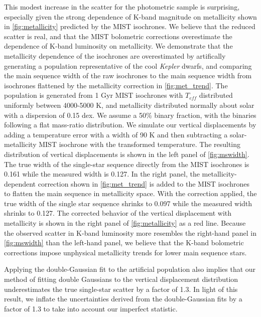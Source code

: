 \documentclass[manuscript]{aastex6}
\newcommand{\Kepler}{\mbox{\textit{Kepler}}}
\newcommand{\Teff}{\ensuremath{T_{eff}}}
\begin{document}
This modest increase in the scatter for the photometric sample is surprising,
especially given the strong dependence of K-band magnitude on metallicity shown
in \cref{fig:metallicity} predicted by the MIST isochrones. We believe that the
reduced scatter is real, and that the MIST bolometric corrections overestimate 
the dependence of K-band luminosity on metallicity. We demonstrate that the
metallicity dependence of the isochrones are overestimated by artifically
generating a population representative of the cool \Kepler{} dwarfs, and
comparing the main sequence width of the raw isochrones to the main sequence
width from isochrones flattened by the metallicity correction
in \cref{fig:met_trend}. The population is generated from 1 Gyr MIST 
isochrones with \Teff{} distributed uniformly between 4000-5000 K, and
metallicity distributed normally about solar with a dispersion of 0.15 dex. We
assume a 50\% binary fraction, with the binaries following a flat mass-ratio
distribution. We simulate our vertical displacements by adding a temperature 
error with a width of 90 K and then subtracting a solar-metallicity MIST
isochrone with the transformed temperature. The resulting distribution of
vertical displacements is shown in the left panel of \cref{fig:mswidth}. The
true width of the single-star sequence directly from the MIST isochrones is 
0.161 while the measured width is 0.127. In the right panel, the 
metallicity-dependent correction shown in \cref{fig:met_trend} is added to 
the MIST isochrones to flatten the main sequence in metallicity space. With 
the correction applied, the true width of the single star sequence shrinks to 
0.097 while the measured width shrinks to 0.127. The corrected behavior of 
the vertical displacement with metallicity is shown in the right panel of 
\cref{fig:metallicity} as a red line. Because the observed scatter in K-band
luminosity more resembles the right-hand panel in \cref{fig:mswidth} than the
left-hand panel, we believe that the K-band bolometric corrections impose 
unphysical metallicity trends for lower main sequence stars.

Applying the double-Gaussian fit to the artificial population also implies 
that our method of fitting double Gaussians to the vertical displacement 
distribution underestimates the true single-star scatter by a factor of 1.3. 
In light of this result, we inflate the uncertainties derived from the
double-Gaussian fits by a factor of 1.3 to take into account our imperfect
statistic.
\end{document}
